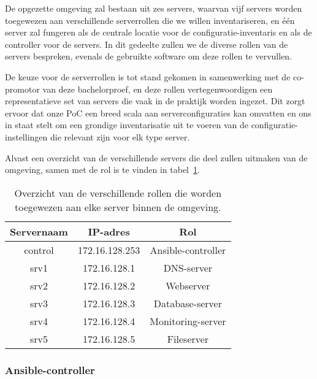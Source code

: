 De opgezette omgeving zal bestaan uit zes servers, waarvan vijf servers worden toegewezen aan verschillende serverrollen die we willen inventariseren, en één server zal fungeren als de centrale locatie voor de configuratie-inventaris en als de controller voor de servers.
In dit gedeelte zullen we de diverse rollen van de servers bespreken, evenals de gebruikte software om deze rollen te vervullen.

De keuze voor de serverrollen is tot stand gekomen in samenwerking met de co-promotor van deze bachelorproef, en deze rollen vertegenwoordigen een representatieve set van servers die vaak in de praktijk worden ingezet.
Dit zorgt ervoor dat onze PoC een breed scala aan serverconfiguraties kan omvatten en ons in staat stelt om een grondige inventarisatie uit te voeren van de configuratie-instellingen die relevant zijn voor elk type server.

Alvast een overzicht van de verschillende servers die deel zullen uitmaken van de omgeving, samen met de rol is te vinden in tabel~\ref{table:poc-server-roles}.

\begin{table}[!h]
    \begin{center}
        \begin{tabular}{ c c c }
            \hline
                Servernaam & IP-adres & Rol \\ [0.5ex]
            \hline
            control & 172.16.128.253 & Ansible-controller \\
            srv1    & 172.16.128.1   & DNS-server \\
            srv2    & 172.16.128.2   & Webserver \\
            srv3    & 172.16.128.3   & Database-server \\
            srv4    & 172.16.128.4   & Monitoring-server \\
            srv5    & 172.16.128.5   & Fileserver \\
        \end{tabular}
    \end{center}
    \caption{Overzicht van de verschillende rollen die worden toegewezen aan elke server binnen de omgeving.}
    \label{table:poc-server-roles}
\end{table}


\subsubsection{Ansible-controller}
\label{poc_ansible_controller}

